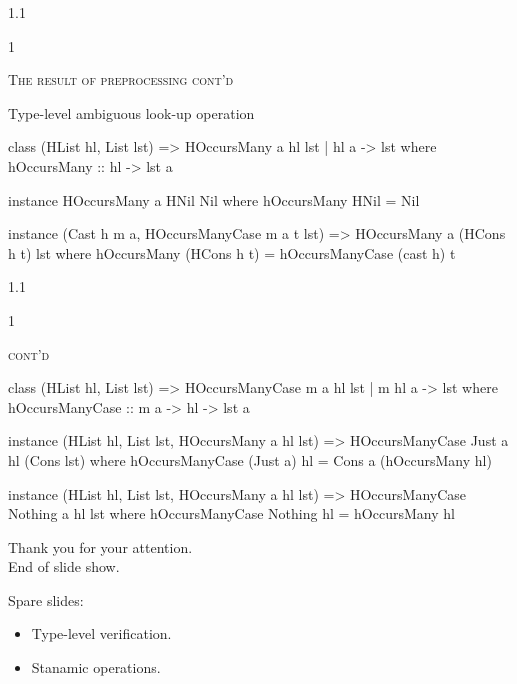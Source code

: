 \documentclass{slides}
\newcommand{\littleskip}{\topsep6pt \parskip6pt \partopsep6pt}
\newcommand{\header}[1]{{\large\scshape \color{Red} #1} \medskip }
\newcommand{\blau}[1]{{\color{Blue} #1} \medskip }
\newenvironment{myslide}{\begin{slide}\color{Blue}\begin{boxedminipage}{1.1\hsize}\begin{boxedminipage}{1\hsize}\color{Black}
\vspace{-170\in}
}{%
\smallskip
\end{boxedminipage}
\end{boxedminipage}
\end{slide}}
\begin{document}
\begin{myslide}

\header{The result of preprocessing cont'd}

\blau{Type-level ambiguous look-up operation}

{\tiny

\begin{code}
class (HList hl, List lst)
   =>  HOccursMany a hl lst | hl a -> lst
 where
  hOccursMany :: hl -> lst a

instance HOccursMany a HNil Nil
 where
  hOccursMany HNil = Nil

instance (Cast h m a, HOccursManyCase m a t lst)
      =>  HOccursMany a (HCons h t) lst
 where
  hOccursMany (HCons h t) = hOccursManyCase (cast h) t
\end{code}

}

\end{myslide}



\begin{myslide}

\header{cont'd}

{\tiny

\begin{code}
class (HList hl, List lst)
   =>  HOccursManyCase m a hl lst | m hl a -> lst
 where
  hOccursManyCase :: m a -> hl -> lst a

instance (HList hl, List lst, HOccursMany a hl lst)
      =>  HOccursManyCase Just a hl (Cons lst)
 where 
  hOccursManyCase (Just a) hl = Cons a (hOccursMany hl) 

instance (HList hl, List lst, HOccursMany a hl lst)
      =>  HOccursManyCase Nothing a hl lst
 where
  hOccursManyCase Nothing hl = hOccursMany hl
\end{code}

}

\end{myslide}






\begin{slide}

\medskip

Thank you for your attention.\\
End of slide show.

\bigskip

{\tiny

Spare slides:
\littleskip\begin{itemize}
\item Type-level verification.
\item Stanamic operations.
\end{itemize}

}

\medskip

\end{slide}
\end{document}
